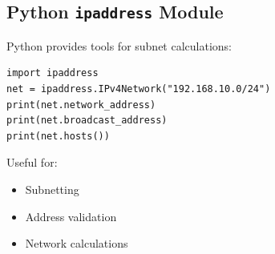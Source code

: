 \subsection{Python \texttt{ipaddress} Module}
Python provides tools for subnet calculations:

\begin{verbatim}
import ipaddress
net = ipaddress.IPv4Network("192.168.10.0/24")
print(net.network_address)
print(net.broadcast_address)
print(net.hosts())
\end{verbatim}

Useful for:
\begin{itemize}
    \item Subnetting
    \item Address validation
    \item Network calculations
\end{itemize}